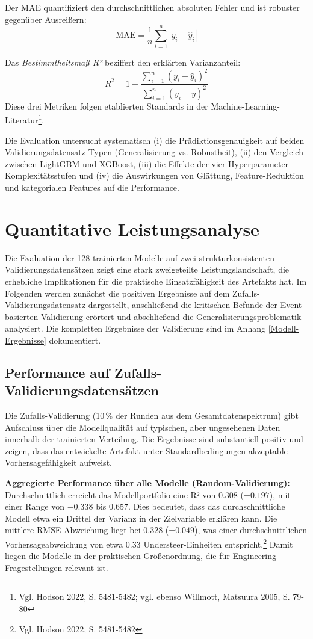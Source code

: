 Der \ac{MAE} quantifiziert den durchschnittlichen absoluten Fehler und ist robuster gegenüber Ausreißern:
\[
\text{MAE} = \frac{1}{n}\sum_{i=1}^{n}|y_i - \hat{y}_i|
\]

Das \textit{Bestimmtheitsmaß R²} beziffert den erklärten Varianzanteil:
\[
R^2 = 1 - \frac{\sum_{i=1}^{n}(y_i - \hat{y}_i)^2}{\sum_{i=1}^{n}(y_i - \bar{y})^2}
\]
Diese drei Metriken folgen etablierten Standards in der Machine-Learning-Literatur\footnote{Vgl. Hodson 2022, S. 5481-5482; vgl. ebenso Willmott, Matsuura 2005, S. 79-80}.

Die Evaluation untersucht systematisch (i) die Prädiktionsgenauigkeit auf beiden Validierungsdatensatz-Typen (Generalisierung vs. Robustheit), (ii) den Vergleich zwischen LightGBM und XGBoost, (iii) die Effekte der vier Hyperparameter-Komplexitätsstufen und (iv) die Auswirkungen von Glättung, Feature-Reduktion und kategorialen Features auf die Performance.


\section{Quantitative Leistungsanalyse}

Die Evaluation der 128 trainierten Modelle auf zwei strukturkonsistenten Validierungsdatensätzen zeigt eine stark zweigeteilte Leistungslandschaft, die erhebliche Implikationen für die praktische Einsatzfähigkeit des Artefakts hat. Im Folgenden werden zunächst die positiven Ergebnisse auf dem Zufalls-Validierungsdatensatz dargestellt, anschließend die kritischen Befunde der Event-basierten Validierung erörtert und abschließend die Generalisierungsproblematik analysiert.
Die kompletten Ergebnisse der Validierung sind im Anhang \ref{Modell-Ergebnisse} dokumentiert.

\subsection{Performance auf Zufalls-Validierungsdatensätzen}

Die Zufalls-Validierung (10\,\% der Runden aus dem Gesamtdatenspektrum) gibt Aufschluss über die Modellqualität auf typischen, aber ungesehenen Daten innerhalb der trainierten Verteilung. Die Ergebnisse sind substantiell positiv und zeigen, dass das entwickelte Artefakt unter Standardbedingungen akzeptable Vorhersagefähigkeit aufweist.

\textbf{Aggregierte Performance über alle Modelle (Random-Validierung):}
Durchschnittlich erreicht das Modellportfolio eine R² von $0.308$ (±$0.197$), mit einer Range von $-0.338$ bis $0.657$. Dies bedeutet, dass das durchschnittliche Modell etwa ein Drittel der Varianz in der Zielvariable erklären kann. Die mittlere RMSE-Abweichung liegt bei $0.328$ (±$0.049$), was einer durchschnittlichen Vorhersageabweichung von etwa $0.33$ Understeer-Einheiten entspricht.\footnote{Vgl. Hodson 2022, S. 5481-5482} Damit liegen die Modelle in der praktischen Größenordnung, die für Engineering-Fragestellungen relevant ist.

